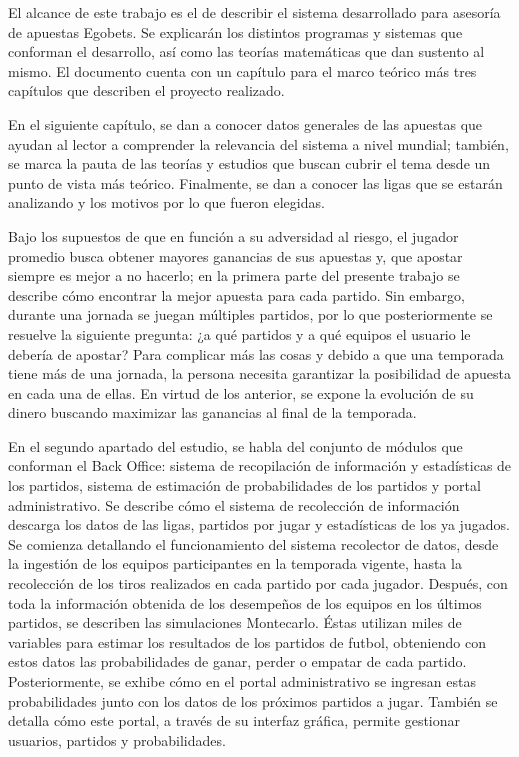 El alcance de este trabajo es el de describir el sistema desarrollado para asesoría de apuestas Egobets. Se explicarán los distintos programas y sistemas que conforman el desarrollo, así como las teorías matemáticas que dan sustento al mismo. El documento cuenta con un capítulo para el marco teórico más tres capítulos que describen el proyecto realizado.

En el siguiente capítulo, se dan a conocer datos generales de las apuestas que ayudan al lector a comprender la relevancia del sistema a nivel mundial; también, se marca la pauta de las teorías y estudios que buscan cubrir el tema desde un punto de vista más teórico. Finalmente, se dan a conocer las ligas que se estarán analizando y los motivos por lo que fueron elegidas.

Bajo los supuestos de que en función a su adversidad al riesgo, el jugador promedio busca obtener mayores ganancias de sus apuestas  y, que apostar siempre es mejor a no hacerlo; en la primera parte del presente trabajo se describe cómo encontrar la mejor apuesta para cada partido. Sin embargo, durante una jornada se juegan múltiples partidos, por lo que posteriormente se resuelve la siguiente pregunta: ¿a qué partidos y a qué equipos el usuario le debería de apostar? Para complicar más las cosas y debido a que una temporada tiene más de una jornada, la persona necesita garantizar la posibilidad de apuesta en cada una de ellas. En virtud de los anterior, se expone la evolución de su dinero buscando maximizar las ganancias al final de la temporada. 


En el segundo apartado del estudio, se habla del conjunto de módulos que conforman el Back Office: sistema de recopilación de información y estadísticas de los partidos, sistema de estimación de probabilidades de los partidos y portal administrativo. Se describe cómo el sistema de recolección de información descarga los datos de las ligas, partidos por jugar y estadísticas de los ya jugados. Se comienza detallando el funcionamiento del sistema recolector de datos, desde la ingestión de los equipos participantes en la temporada vigente, hasta la recolección de los tiros realizados en cada partido por cada jugador. Después, con toda la información obtenida de los desempeños de los equipos en los últimos partidos, se describen las simulaciones Montecarlo. Éstas utilizan miles de variables para estimar los resultados de los partidos de futbol, obteniendo con estos datos las probabilidades de ganar, perder o empatar de cada partido. Posteriormente, se exhibe cómo en el portal administrativo se ingresan estas probabilidades junto con los datos de los próximos partidos a jugar. También se detalla cómo este portal, a través de su interfaz gráfica, permite gestionar usuarios, partidos y probabilidades.


